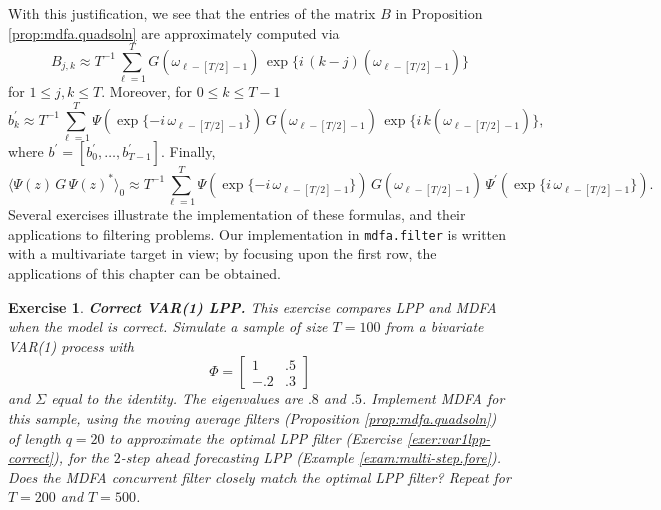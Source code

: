 \documentclass[a4paper]{book}
\newtheorem{Exercise}{Exercise}
\begin{document}
With this justification, we see that the entries of the matrix $B$ in 
 Proposition \ref{prop:mdfa.quadsoln} are approximately computed via
\[
  B_{j,k} \approx T^{-1} \sum_{\ell=1}^T G (\omega_{\ell-[T/2]-1}) \,
   \exp \{ i \, (k-j) (\omega_{\ell-[T/2]-1}) \}
\]
 for $1 \leq j,k \leq T$.  Moreover, for $0 \leq k \leq T-1$
\[
  b_k^{\prime} \approx T^{-1}  \sum_{\ell=1}^T \Psi 
	( \exp\{ -i \,\omega_{\ell-[T/2]-1} \}) \,
     G (\omega_{\ell-[T/2]-1}) \,
   \exp \{ i \, k (\omega_{\ell-[T/2]-1}) \},
\]
 where $b^{\prime} = [ b_0^{\prime}, \ldots, b_{T-1}^{\prime} ]$.  Finally,
\[
  { \langle \Psi (z) \, G \, { \Psi (z) }^* \rangle }_0 \approx
  T^{-1}  \sum_{\ell=1}^T \Psi 
	( \exp\{ -i \,\omega_{\ell-[T/2]-1} \}) \,
     G (\omega_{\ell-[T/2]-1}) \,  \Psi^{\prime} 
	( \exp\{ i \,\omega_{\ell-[T/2]-1} \}).
\]
 Several exercises illustrate the implementation of these formulas,
 and their applications to filtering problems.  Our implementation
 in {\tt mdfa.filter} is written with a multivariate target in view;
 by focusing upon the first row, the applications of this chapter 
 can be obtained. 

 


\begin{Exercise} {\bf Correct VAR(1) LPP.} \rm
\label{exer:var1lpp-correct.2}
 This exercise compares LPP and MDFA when the model is correct.
 Simulate a sample of size $T=100$ from a
  bivariate VAR(1) process with 
\[
  \Phi = \left[ \begin{array}{ll} 1 & .5 \\ -.2 & .3 \end{array} \right]
\]
 and $\Sigma$ equal to the identity.  The eigenvalues are $.8$ and $.5$.
  Implement MDFA for this sample, using the moving average filters
 (Proposition \ref{prop:mdfa.quadsoln}) of length $q = 20$ to approximate the optimal
 LPP filter (Exercise \ref{exer:var1lpp-correct}), for the $2$-step
 ahead forecasting LPP (Example \ref{exam:multi-step.fore}). 
  Does the MDFA concurrent filter closely
 match the optimal LPP filter?  Repeat for $T=200$ and $T=500$.
\end{Exercise}
\end{document}
